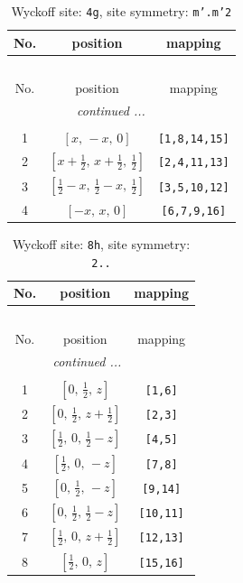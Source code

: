 \documentclass[fleqn,8pt]{jsarticle}
\begin{document}
\renewcommand{\arraystretch}{1.2}
\begin{longtable}{ccc}
\caption{Wyckoff site: {\tt 4g}, site symmetry: {\tt m'.m'2}}
 \\
 \hline \hline
No. & position & mapping \\ \hline \endfirsthead

\multicolumn{2}{l}{\tablename\ \thetable{}} \\
 \hline \hline
No. & position & mapping \\ \hline \endhead

 \hline \hline
\multicolumn{2}{r}{\footnotesize\it continued ...} \\ \endfoot

 \hline \hline
\multicolumn{2}{r}{} \\ \endlastfoot

1 & $\left[ x,\, - x,\, 0 \right]$ & {\tt [1,8,14,15]} \\ \hline
2 & $\left[ x + \frac{1}{2},\, x + \frac{1}{2},\, \frac{1}{2} \right]$ & {\tt [2,4,11,13]} \\ \hline
3 & $\left[ \frac{1}{2} - x,\, \frac{1}{2} - x,\, \frac{1}{2} \right]$ & {\tt [3,5,10,12]} \\ \hline
4 & $\left[ - x,\, x,\, 0 \right]$ & {\tt [6,7,9,16]} \\
\end{longtable}
\renewcommand{\arraystretch}{1.2}
\begin{longtable}{ccc}
\caption{Wyckoff site: {\tt 8h}, site symmetry: {\tt 2..}}
 \\
 \hline \hline
No. & position & mapping \\ \hline \endfirsthead

\multicolumn{2}{l}{\tablename\ \thetable{}} \\
 \hline \hline
No. & position & mapping \\ \hline \endhead

 \hline \hline
\multicolumn{2}{r}{\footnotesize\it continued ...} \\ \endfoot

 \hline \hline
\multicolumn{2}{r}{} \\ \endlastfoot

1 & $\left[ 0,\, \frac{1}{2},\, z \right]$ & {\tt [1,6]} \\ \hline
2 & $\left[ 0,\, \frac{1}{2},\, z + \frac{1}{2} \right]$ & {\tt [2,3]} \\ \hline
3 & $\left[ \frac{1}{2},\, 0,\, \frac{1}{2} - z \right]$ & {\tt [4,5]} \\ \hline
4 & $\left[ \frac{1}{2},\, 0,\, - z \right]$ & {\tt [7,8]} \\ \hline
5 & $\left[ 0,\, \frac{1}{2},\, - z \right]$ & {\tt [9,14]} \\ \hline
6 & $\left[ 0,\, \frac{1}{2},\, \frac{1}{2} - z \right]$ & {\tt [10,11]} \\ \hline
7 & $\left[ \frac{1}{2},\, 0,\, z + \frac{1}{2} \right]$ & {\tt [12,13]} \\ \hline
8 & $\left[ \frac{1}{2},\, 0,\, z \right]$ & {\tt [15,16]} \\
\end{longtable}
\end{document}
